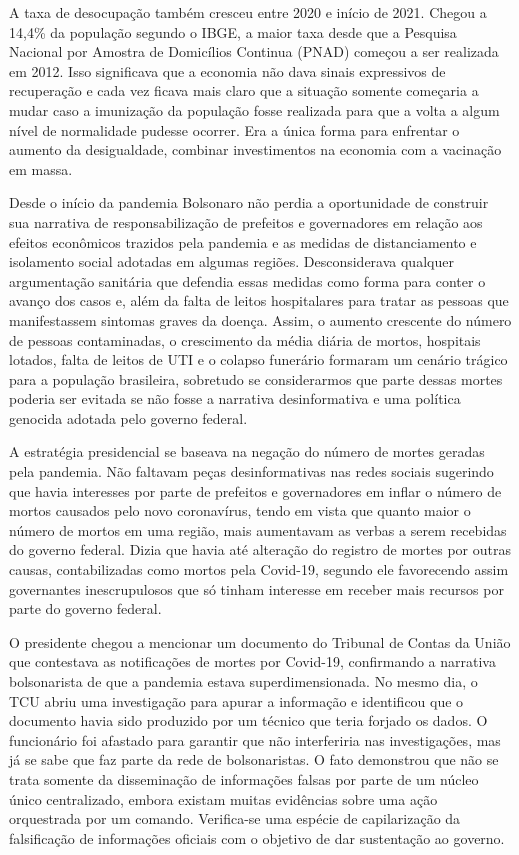 A taxa de desocupação também cresceu entre 2020 e início de 2021. Chegou
a 14,4\% da população segundo o IBGE, a maior taxa desde que a Pesquisa
Nacional por Amostra de Domicílios Continua (PNAD) começou a ser
realizada em 2012. Isso significava que a economia não dava sinais
expressivos de recuperação e cada vez ficava mais claro que a situação
somente começaria a mudar caso a imunização da população fosse realizada
para que a volta a algum nível de normalidade pudesse ocorrer. Era a
única forma para enfrentar o aumento da desigualdade, combinar
investimentos na economia com a vacinação em massa.

Desde o início da pandemia Bolsonaro não perdia a oportunidade de
construir sua narrativa de responsabilização de prefeitos e governadores
em relação aos efeitos econômicos trazidos pela pandemia e as medidas de
distanciamento e isolamento social adotadas em algumas regiões.
Desconsiderava qualquer argumentação sanitária que defendia essas
medidas como forma para conter o avanço dos casos e, além da falta de
leitos hospitalares para tratar as pessoas que manifestassem sintomas
graves da doença. Assim, o aumento crescente do número de pessoas
contaminadas, o crescimento da média diária de mortos, hospitais
lotados, falta de leitos de UTI e o colapso funerário formaram um
cenário trágico para a população brasileira, sobretudo se considerarmos
que parte dessas mortes poderia ser evitada se não fosse a narrativa
desinformativa e uma política genocida adotada pelo governo federal.

A estratégia presidencial se baseava na negação do número de mortes
geradas pela pandemia. Não faltavam peças desinformativas nas redes
sociais sugerindo que havia interesses por parte de prefeitos e
governadores em inflar o número de mortos causados pelo novo
coronavírus, tendo em vista que quanto maior o número de mortos em uma
região, mais aumentavam as verbas a serem recebidas do governo federal.
Dizia que havia até alteração do registro de mortes por outras causas,
contabilizadas como mortos pela Covid-19, segundo ele favorecendo assim
governantes inescrupulosos que só tinham interesse em receber mais
recursos por parte do governo federal.

O presidente chegou a mencionar um documento do Tribunal de Contas da
União que contestava as notificações de mortes por Covid-19, confirmando
a narrativa bolsonarista de que a pandemia estava superdimensionada. No
mesmo dia, o TCU abriu uma investigação para apurar a informação e
identificou que o documento havia sido produzido por um técnico que
teria forjado os dados. O funcionário foi afastado para garantir que não
interferiria nas investigações, mas já se sabe que faz parte da rede de
bolsonaristas. O fato demonstrou que não se trata somente da
disseminação de informações falsas por parte de um núcleo único
centralizado, embora existam muitas evidências sobre uma ação
orquestrada por um comando. Verifica-se uma espécie de capilarização da
falsificação de informações oficiais com o objetivo de dar sustentação
ao governo.

